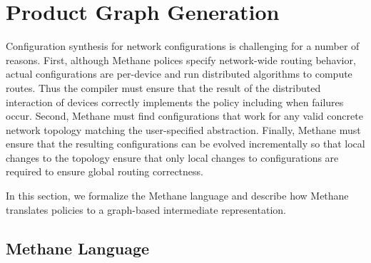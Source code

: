 \documentclass[numbers, 10pt, preprint]{sigplanconf}
\newcommand{\sysname}{{\small \sf Methane}\xspace}
\begin{document}
%
%
%


%
%
%
%

\section{Product Graph Generation}
\label{sec:language}

Configuration synthesis for network configurations is challenging for a number of reasons. First, although \sysname polices specify network-wide routing behavior, actual configurations are per-device and run distributed algorithms to compute routes. Thus the compiler must ensure that the result of the distributed interaction of devices correctly implements the policy including when failures occur. Second, \sysname must find configurations that work for any valid concrete network topology matching the user-specified abstraction. Finally, \sysname must ensure that the resulting configurations can be evolved incrementally so that local changes to the topology ensure that only local changes to configurations are required to ensure global routing correctness.

In this section, we formalize the \sysname language and describe how \sysname translates policies to a graph-based intermediate representation.

\subsection{Methane Language}
\end{document}

